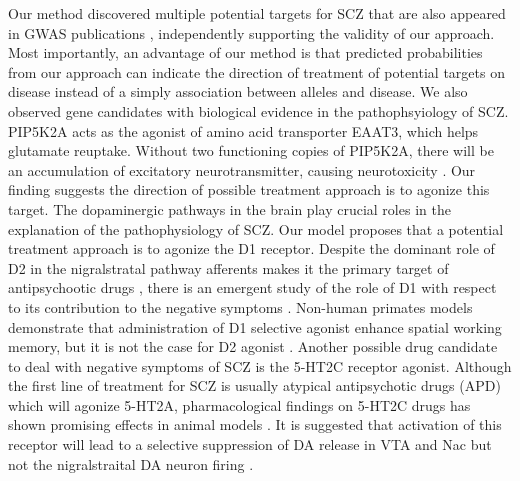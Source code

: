     Our method discovered multiple potential targets for SCZ that are also appeared in GWAS publications \cite{zhang2015functional,golimbet2014study,lee2013pathway,sinclair2012glucocorticoid,ahmad2015association,kishi2011sirt1,athanasiou2011candidate,hoenicka2010sexually,tein2008short,sun2004cldn5,chen2004case,yu2008association,hashimoto2005functional}, independently supporting the validity of our approach. Most importantly, an advantage of our method is that predicted probabilities from our approach can indicate the direction of treatment of potential targets on disease instead of a simply association between alleles and disease. We also observed gene candidates with biological evidence in the pathophsyiology of SCZ. PIP5K2A acts as the agonist of amino acid transporter EAAT3, which helps glutamate reuptake. Without two functioning copies of PIP5K2A, there will be an accumulation of excitatory neurotransmitter, causing neurotoxicity \cite{fedorenko2009pip5k2a}. Our finding suggests the direction of possible treatment approach is to agonize this target. The dopaminergic pathways in the brain play crucial roles in the explanation of the pathophysiology of SCZ. Our model proposes that a potential treatment approach is to agonize the D1 receptor. Despite the dominant role of D2 in the nigralstratal pathway afferents makes it the primary target of antipsychootic drugs \cite{howes2009dopamine}, there is an emergent study of the role of D1 with respect to its contribution to the negative symptoms \cite{goldman2004targeting}. Non-human primates models demonstrate that administration of D1 selective agonist enhance spatial working memory, but it is not the case for D2 agonist \cite{goldman2004targeting}. Another possible drug candidate to deal with negative symptoms of SCZ is the 5-HT2C receptor agonist. Although the first line of treatment for SCZ is usually atypical antipsychotic drugs (APD) which will agonize 5-HT2A, pharmacological findings on 5-HT2C drugs has shown promising effects in animal models \cite{floresco2009neural,hemrick2002comparison,pogorelov20175}. It is suggested that activation of this receptor will lead to a selective suppression of DA release in VTA and Nac but not the nigralstraital DA neuron firing \cite{meltzer20115}.
  
